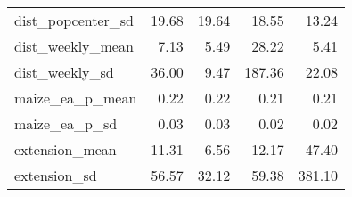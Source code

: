 \begin{table}[ht]
\begin{tabular}{lrrrr}
  dist_popcenter_sd & 19.68 & 19.64 & 18.55 & 13.24 \\ 
  dist_weekly_mean & 7.13 & 5.49 & 28.22 & 5.41 \\ 
  dist_weekly_sd & 36.00 & 9.47 & 187.36 & 22.08 \\ 
  maize_ea_p_mean & 0.22 & 0.22 & 0.21 & 0.21 \\ 
  maize_ea_p_sd & 0.03 & 0.03 & 0.02 & 0.02 \\ 
  extension_mean & 11.31 & 6.56 & 12.17 & 47.40 \\ 
  extension_sd & 56.57 & 32.12 & 59.38 & 381.10 \\ 
   \hline
\end{tabular}
\end{table}
